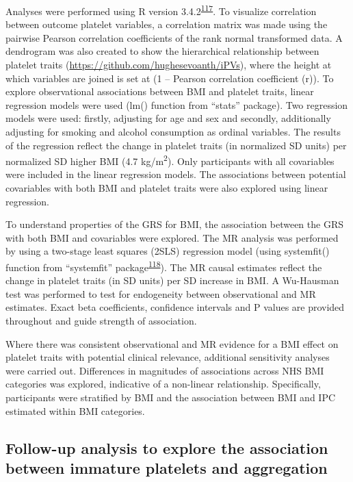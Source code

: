 \documentclass[11pt,twoside]{bristolthesis}
\begin{document}
Analyses were performed using R version 3.4.2\textsuperscript{\protect\hyperlink{ref-Team2019a}{117}}. To visualize correlation between outcome platelet variables, a correlation matrix was made using the pairwise Pearson correlation coefficients of the rank normal transformed data. A dendrogram was also created to show the hierarchical relationship between platelet traits (\url{https://github.com/hughesevoanth/iPVs}), where the height at which variables are joined is set at (1 -- Pearson correlation coefficient (r)). To explore observational associations between BMI and platelet traits, linear regression models were used (lm() function from ``stats'' package). Two regression models were used: firstly, adjusting for age and sex and secondly, additionally adjusting for smoking and alcohol consumption as ordinal variables. The results of the regression reflect the change in platelet traits (in normalized SD units) per normalized SD higher BMI (4.7 kg/m\textsuperscript{2}). Only participants with all covariables were included in the linear regression models. The associations between potential covariables with both BMI and platelet traits were also explored using linear regression.

To understand properties of the GRS for BMI, the association between the GRS with both BMI and covariables were explored. The MR analysis was performed by using a two-stage least squares (2SLS) regression model (using systemfit() function from ``systemfit'' package\textsuperscript{\protect\hyperlink{ref-Henningsen2007}{118}}). The MR causal estimates reflect the change in platelet traits (in SD units) per SD increase in BMI. A Wu-Hausman test was performed to test for endogeneity between observational and MR estimates. Exact beta coefficients, confidence intervals and P values are provided throughout and guide strength of association.

Where there was consistent observational and MR evidence for a BMI effect on platelet traits with potential clinical relevance, additional sensitivity analyses were carried out. Differences in magnitudes of associations across NHS BMI categories was explored, indicative of a non-linear relationship. Specifically, participants were stratified by BMI and the association between BMI and IPC estimated within BMI categories.

\hypertarget{follow-up-analysis-to-explore-the-association-between-immature-platelets-and-aggregation}{%
\subsection{Follow-up analysis to explore the association between immature platelets and aggregation}\label{follow-up-analysis-to-explore-the-association-between-immature-platelets-and-aggregation}}
\end{document}
